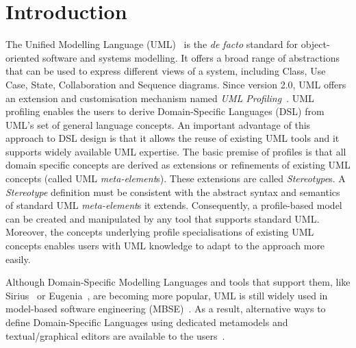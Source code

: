 \section{Introduction}
\label{sec:introduction}

The Unified Modelling Language (UML)~\cite{UML2015OMG} is the \emph{de facto} standard for object-oriented software and systems modelling. 
It offers a broad range of abstractions that can be used to express different views of a system, including Class, Use Case, State, Collaboration and Sequence diagrams. 
Since version 2.0, UML offers an extension and customisation mechanism named \emph{UML Profiling}~\cite{FuentesFernandez2004:UMLME}.
UML profiling enables the users to derive Domain-Specific Languages (DSL) from UML's set of general language concepts.
An important advantage of this approach to DSL design is that it allows the reuse of existing UML tools and it supports widely available UML expertise.
The basic premise of profiles is that all domain specific concepts are derived as extensions or refinements of existing UML concepts (called UML \textit{meta-element}s). 
These extensions are called \textit{Stereotype}s. 
A \textit{Stereotype} definition must be consistent with the abstract syntax and semantics of standard UML \textit{meta-element}s it extends. 
Consequently, a profile-based model can be created and manipulated by any tool that supports standard UML. 
Moreover, the concepts underlying profile specialisations of existing UML concepts enables users with UML knowledge to adapt to the approach more easily.

Although Domain-Specific Modelling Languages and tools that support them, like Sirius~\cite{viyovic2014sirius} or Eugenia~\cite{kolovos2015eugenia}, are becoming more popular, UML is still widely used in model-based software engineering (MBSE)~\cite{erickson2007theoretical}. 
As a result, alternative ways to define Domain-Specific Languages using dedicated metamodels and textual/graphical editors are available to the users~\cite{Bergmayr2014:MODELS,Pardillo2010:MODELS}. 

